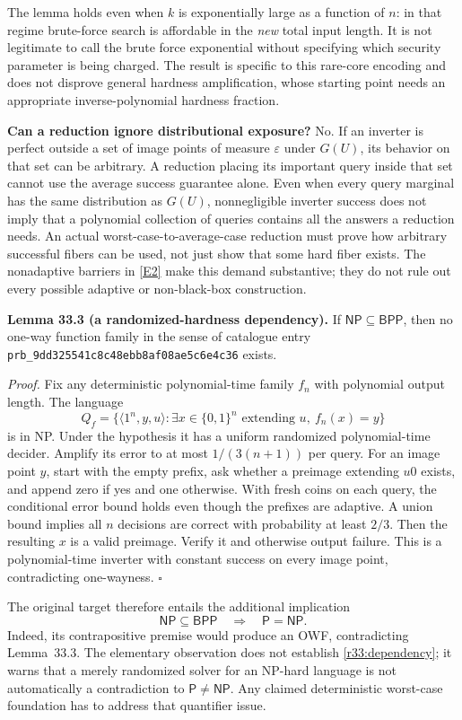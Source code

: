 \documentclass[11pt,a4paper]{article}
\newcommand{\eref}[2]{\hyperlink{extra:#1:#2}{[E#2]}}
\numberwithin{equation}{section}
\begin{document}
The lemma holds even when $k$ is exponentially large as a function of $n$:
in that regime brute-force search is affordable in the \emph{new} total
input length. It is not legitimate to call the brute force exponential
without specifying which security parameter is being charged. The result
is specific to this rare-core encoding and does not disprove general
hardness amplification, whose starting point needs an appropriate
inverse-polynomial hardness fraction.

\medskip
\textbf{Can a reduction ignore distributional exposure?}
No. If an inverter is perfect outside a set of image points of measure
$\varepsilon$ under $G(U)$, its behavior on that set can be arbitrary.
A reduction placing its important query inside that set cannot use the
average success guarantee alone. Even when every query marginal has the
same distribution as $G(U)$, nonnegligible inverter success does not imply
that a polynomial collection of queries contains all the answers a
reduction needs. An actual worst-case-to-average-case reduction must prove
how arbitrary successful fibers can be used, not just show that some hard
fiber exists. The nonadaptive barriers in \eref{statement}{2} make this demand
substantive; they do not rule out every possible adaptive or non-black-box
construction.

\medskip
\textbf{Lemma 33.3 (a randomized-hardness dependency).}
If $\mathsf{NP}\subseteq\mathsf{BPP}$, then no one-way function family in
the sense of catalogue entry \texttt{prb\_9dd325541c8c48ebb8af08ae5c6e4c36} exists.

\emph{Proof.} Fix any deterministic polynomial-time family $f_n$ with
polynomial output length. The language
\[
 Q_f=\{\langle1^n,y,u\rangle:
       \exists x\in\{0,1\}^n\text{ extending }u,\ f_n(x)=y\}
\]
is in NP. Under the hypothesis it has a uniform randomized polynomial-time
decider. Amplify its error to at most $1/(3(n+1))$ per query. For an image
point $y$, start with the empty prefix, ask whether a preimage extending
$u0$ exists, and append zero if yes and one otherwise. With fresh coins on
each query, the conditional error bound holds even though the prefixes
are adaptive. A union bound implies all $n$ decisions are correct with
probability at least $2/3$. Then the resulting $x$ is a valid preimage.
Verify it and otherwise output failure. This is a polynomial-time inverter
with constant success on every image point, contradicting one-wayness.
\hfill$\square$

The original target therefore entails the additional implication
\begin{equation}\label{r33:dependency}
 \mathsf{NP}\subseteq\mathsf{BPP}\quad\Longrightarrow\quad
                      \mathsf P=\mathsf{NP}.
\end{equation}
Indeed, its contrapositive premise would produce an OWF, contradicting
Lemma~33.3. The elementary observation does not establish
\eqref{r33:dependency}; it warns that a merely randomized solver for an
NP-hard language is not automatically a contradiction to
$\mathsf P\ne\mathsf{NP}$. Any claimed deterministic worst-case foundation
has to address that quantifier issue.
\end{document}
